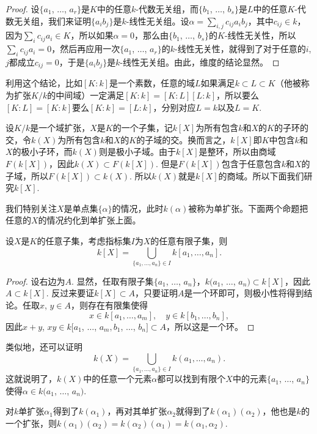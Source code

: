 \begin{proof} 
	设$\{a_1$, $\dots$, $a_r\}$是$K$中的任意$k$-代数无关组，而$\{b_1$, $\dots$, $b_s\}$是$L$中的任意$K$-代数无关组，我们来证明$\{a_ib_j\}$是$k$-线性无关组。设$\alpha=\sum_{i,j}c_{ij}a_ib_j$，其中$c_{ij}\in k$，因为$\sum_i c_{ij}a_i\in K$，所以如果$\alpha=0$，那么由$\{b_1$, $\dots$, $b_s\}$的$K$-线性无关性，所以$\sum_i c_{ij}a_i=0$，然后再应用一次$\{a_1$, $\dots$, $a_r\}$的$k$-线性无关性，就得到了对于任意的$i$, $j$都成立$c_{ij}=0$，于是$\{a_ib_j\}$是$k$-线性无关组。由此，维度的结论显然。
\end{proof}

利用这个结论，比如$[K:k]$是一个素数，任意的域$L$如果满足$k\subset L\subset K$（他被称为扩张$K/k$的中间域）一定满足$[K:k]=[K:L][L:k]$，所以要么$[K:L]=[K:k]$要么$[K:k]=[L:k]$，分别对应$L=k$以及$L=K$. 

\para 设$K/k$是一个域扩张，$X$是$K$的一个子集，记$k[X]$为所有包含$k$和$X$的$K$的子环的交，令$k(X)$为所有包含$k$和$X$的$K$的子域的交。换而言之，$k[X]$即$K$中包含$k$和$X$的极小子环，而$k(X)$则是极小子域。由于$k[X]$是整环，所以由商域$F(k[X])$，因此$k(X)\subset F(k[X])$. 但是$F(k[X])$包含于任意包含$k$和$X$的子域，所以$F(k[X])\subset k(X)$. 所以$k(X)$就是$k[X]$的商域。所以下面我们研究$k[X]$.

我们特别关注$X$是单点集$\{\alpha\}$的情况，此时$k(\alpha)$被称为单扩张。下面两个命题把任意的$X$的情况约化到单扩张上面。

\begin{pro}
设$X$是$K$的任意子集，考虑指标集$I$为$X$的任意有限子集，则
\[
	k[X]=\bigcup_{\{a_1,\dots,a_n\}\in I} k[a_1,\dots,a_n].
\]
\end{pro}

\begin{proof}
	设右边为$A$. 显然，任取有限子集$\{a_1$, $\dots$, $a_n\}$，$k(a_1$, $\dots$, $a_n)\subset k[X]$，因此$A\subset k[X]$. 反过来要证$k[X]\subset A$，只要证明$A$是一个环即可，则极小性将得到结论。任取$x$, $y\in A$，则存在有限集使得
	\[
		x\in k[a_1,\dots,a_m],\quad y\in k[b_1,\dots,b_n],
	\]
	因此$x+y$, $xy\in k[a_1$, $\dots$, $a_m,b_1$, $\dots$, $b_n]\subset A$，所以这是一个环。
\end{proof}

类似地，还可以证明
\[
	k(X)=\bigcup_{\{a_1,\dots,a_n\}\in I} k(a_1,\dots,a_n).
\]
这就说明了，$k(X)$中的任意一个元素$\alpha$都可以找到有限个$X$中的元素$\{a_1$, $\dots$, $a_n\}$使得$\alpha\in k(a_1$, $\dots$, $a_n)$.

\begin{pro}
对$k$单扩张$\alpha_1$得到了$k(\alpha_1)$，再对其单扩张$\alpha_2$就得到了$k(\alpha_1)(\alpha_2)$，他也是$k$的一个扩张，则$k(\alpha_1)(\alpha_2)= k(\alpha_2)(\alpha_1)=k(\alpha_1,\alpha_2)$.
\end{pro}

